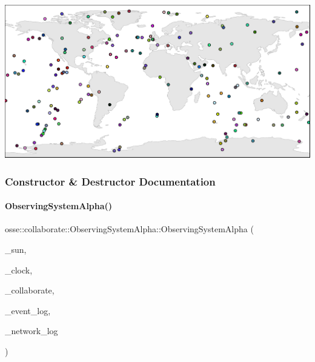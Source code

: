  
\begin{DoxyImageNoCaption}
  \mbox{\includegraphics[width=\textwidth]{map}}
\end{DoxyImageNoCaption}
 

\subsubsection{Constructor \& Destructor Documentation}
\mbox{\label{classosse_1_1collaborate_1_1_observing_system_alpha_ab282044b92aabebc6d9d31e0c9ab84b6}} 
\paragraph{\texorpdfstring{Observing\+System\+Alpha()}{ObservingSystemAlpha()}\hspace{0.1cm}{\footnotesize\ttfamily [1/2]}}
{\footnotesize\ttfamily osse\+::collaborate\+::\+Observing\+System\+Alpha\+::\+Observing\+System\+Alpha (\begin{DoxyParamCaption}\item[{\hyperlink{classosse_1_1collaborate_1_1_sun}{Sun} $\ast$}]{\+\_\+sun,  }\item[{\hyperlink{classosse_1_1collaborate_1_1_simulation_clock}{Simulation\+Clock} $\ast$}]{\+\_\+clock,  }\item[{\hyperlink{classosse_1_1collaborate_1_1_scheduler}{Scheduler} $\ast$}]{\+\_\+collaborate,  }\item[{\hyperlink{classosse_1_1collaborate_1_1_event_logger}{Event\+Logger} $\ast$}]{\+\_\+event\+\_\+log,  }\item[{\hyperlink{classosse_1_1collaborate_1_1_data_logger}{Data\+Logger} $\ast$}]{\+\_\+network\+\_\+log }\end{DoxyParamCaption})}



